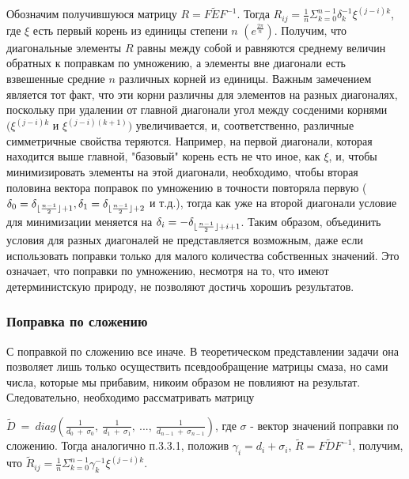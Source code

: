 \documentclass[a4paper]{article}
\DeclarePairedDelimiter\floor{\lfloor}{\rfloor}
\theoremstyle{definition}
\begin{document}
    Обозначим получившуюся матрицу $R = F\tilde{E}F^{-1}$. Тогда $R_{ij} = \frac{1}{n}\Sigma_{k=0}^{n-1} \delta_k^{-1} \xi^{(j-i)k}$, где $\xi$ есть первый корень из единицы степени $n$  $(e^{\frac{2\pi}{n}})$. Получим, что диагональные элементы $R$ равны между собой и равняются среднему величин обратных к поправкам по умножению, а элементы вне диагонали есть взвешенные средние $n$ различных корней из единицы. Важным замечением является тот факт, что эти корни различны для элементов на разных диагоналях, поскольку при удалении от главной диагонали угол между сосденими корнями $(\xi^{(j-i)k}$ и $\xi^{(j-i)(k+1)})$ увеличивается, и, соответственно, различные симметричные свойства теряются. Например, на первой диагонали, которая находится выше главной, "базовый" корень есть не что иное, как $\xi$, и, чтобы минимизировать элементы на этой диагонали, необходимо, чтобы вторая половина вектора поправок по умножению в точности повторяла первую ($\delta_0 = \delta_{\floor{\frac{n-1}{2}}+1}, \delta_1 = \delta_{\floor{\frac{n-1}{2}}+2}$ и т.д.), тогда как уже на второй диагонали условие для минимизации меняется на $\delta_i = -\delta_{\floor{\frac{n-1}{2}}+i+1}$. Таким образом, объединить условия для разных диагоналей не представляется возможным, даже если использовать поправки только для малого количества собственных значений. Это означает, что поправки по умножению, несмотря на то, что имеют детерминистскую природу, не позволяют достичь хорошиъ результатов.


    \subsubsection{Поправка по сложению}


    С поправкой по сложению все иначе. В теоретическом представлении задачи она позволяет лишь только осуществить псевдообращение матрицы смаза, но сами числа, которые мы прибавим, никоим образом не повлияют на результат. Следовательно, необходимо рассматривать матрицу

$\tilde{D}~=~diag(\frac{1}{d_0~+~\sigma_0},~\frac{1}{d_1~+~\sigma_1},~...,~\frac{1}{d_{n-1}~+~\sigma_{n-1}})$, где $\sigma$ - вектор значений поправки по сложению. Тогда аналогично п.3.3.1, положив $\gamma_i = d_i + \sigma_i$, $\tilde{R} = F\tilde{D}F^{-1}$, получим, что $\tilde{R}_{ij} = \frac{1}{n}\Sigma_{k=0}^{n-1} \gamma_k^{-1} \xi^{(j-i)k}$.
\end{document}
